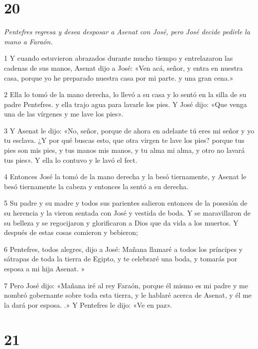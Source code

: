 \chapter{20}

\par \textit{Pentefres regresa y desea desposar a Asenat con José, pero José decide pedirle la mano a Faraón.}

\par 1 Y cuando estuvieron abrazados durante mucho tiempo y entrelazaron las cadenas de sus manos, Asenat dijo a José: «Ven acá, señor, y entra en nuestra casa, porque yo he preparado nuestra casa por mi parte. y una gran cena.»

\par 2 Ella lo tomó de la mano derecha, lo llevó a su casa y lo sentó en la silla de su padre Pentefres. y ella trajo agua para lavarle los pies. Y José dijo: «Que venga una de las vírgenes y me lave los pies».

\par 3 Y Asenat le dijo: «No, señor, porque de ahora en adelante tú eres mi señor y yo tu esclava. ¿Y por qué buscas esto, que otra virgen te lave los pies? porque tus pies son mis pies, y tus manos mis manos, y tu alma mi alma, y ​​otro no lavará tus pies». Y ella lo contuvo y le lavó el fect.

\par 4 Entonces José la tomó de la mano derecha y la besó tiernamente, y Asenat le besó tiernamente la cabeza y entonces la sentó a su derecha.

\par 5 Su padre y su madre y todos sus parientes salieron entonces de la posesión de su herencia y la vieron sentada con José y vestida de boda. Y se maravillaron de su belleza y se regocijaron y glorificaron a Dios que da vida a los muertos. Y después de estas cosas comieron y bebieron;

\par 6 Pentefres, todos alegres, dijo a José: Mañana llamaré a todos los príncipes y sátrapas de toda la tierra de Egipto, y te celebraré una boda, y tomarás por esposa a mi hija Asenat. »

\par 7 Pero José dijo: «Mañana iré al rey Faraón, porque él mismo es mi padre y me nombró gobernante sobre toda esta tierra, y le hablaré acerca de Asenat, y él me la dará por esposa. .» Y Pentefres le dijo: «Ve en paz».

\chapter{21}

